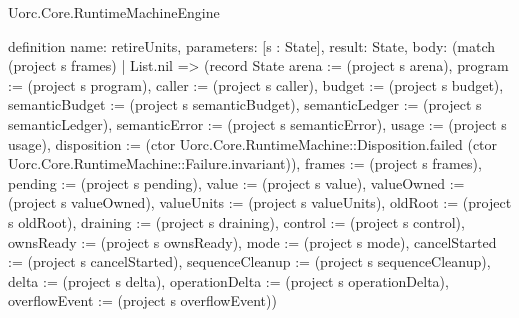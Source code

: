 \begin{lexlean}{Uorc.Core.RuntimeMachineEngine}
\begin{semanticmodule}
definition{
  name: retireUnits,
  parameters: [s : State],
  result: State,
  body: (match (project s frames)
    | List.nil => (record State {arena := (project s arena), program := (project s program), caller := (project s caller), budget := (project s budget), semanticBudget := (project s semanticBudget), semanticLedger := (project s semanticLedger), semanticError := (project s semanticError), usage := (project s usage), disposition := (ctor Uorc.Core.RuntimeMachine::Disposition.failed (ctor Uorc.Core.RuntimeMachine::Failure.invariant)), frames := (project s frames), pending := (project s pending), value := (project s value), valueOwned := (project s valueOwned), valueUnits := (project s valueUnits), oldRoot := (project s oldRoot), draining := (project s draining), control := (project s control), ownsReady := (project s ownsReady), mode := (project s mode), cancelStarted := (project s cancelStarted), sequenceCleanup := (project s sequenceCleanup), delta := (project s delta), operationDelta := (project s operationDelta), overflowEvent := (project s overflowEvent)})
}
\end{semanticmodule}
\end{lexlean}
